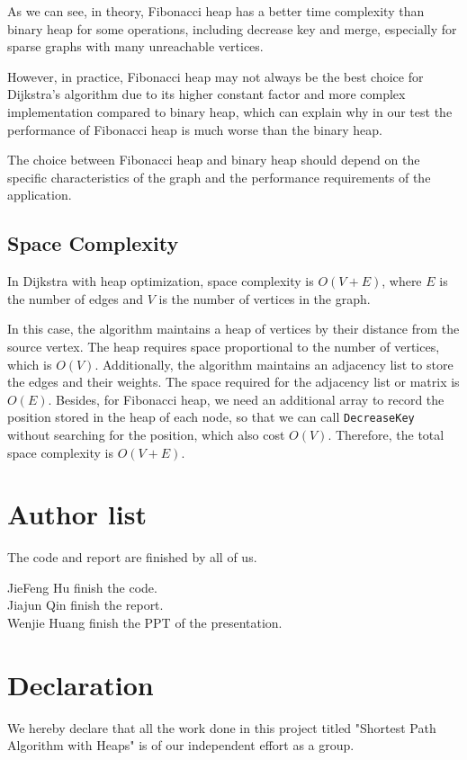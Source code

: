 \documentclass[twoside]{article}
\begin{document}
\begin{CJK*}{UTF8}{gbsn}
\begin{itemize}
    As we can see, in theory, Fibonacci heap has a better time complexity than binary heap for some operations, including decrease key and merge, especially for sparse graphs with many unreachable vertices.   
    
    However, in practice, Fibonacci heap may not always be the best choice for Dijkstra's algorithm due to its higher constant factor and more complex implementation compared to binary heap, which can explain why in our test the performance of Fibonacci heap is much worse than the binary heap. 
    
    The choice between Fibonacci heap and binary heap should depend on the specific characteristics of the graph and the performance requirements of the application.
\end{itemize}
\subsection{Space Complexity}
In Dijkstra with heap optimization, space complexity is $O(V + E)$, where $E$ is the number of edges and $V$ is the number of vertices in the graph.   

In this case, the algorithm maintains a heap of vertices by their distance from the source vertex. The heap requires space proportional to the number of vertices, which is $O(V)$. Additionally, the algorithm maintains an adjacency list to store the edges and their weights. The space required for the adjacency list or matrix is $O(E)$. Besides, for Fibonacci heap, we need an additional array to record the position stored in the  heap of each node, so that we can call \verb|DecreaseKey| without searching for the position, which also cost $O(V)$. Therefore, the total space complexity is $O(V + E)$. 

\section{Author list}
The code and report are finished by all of us.


JieFeng Hu finish the code.\\
Jiajun Qin finish the report.\\
Wenjie Huang finish the PPT of the presentation.

\section*{Declaration}
We hereby declare that all the work done in this project titled "Shortest Path Algorithm with Heaps" is of our independent effort as a group.


\end{CJK*}
\end{document}
